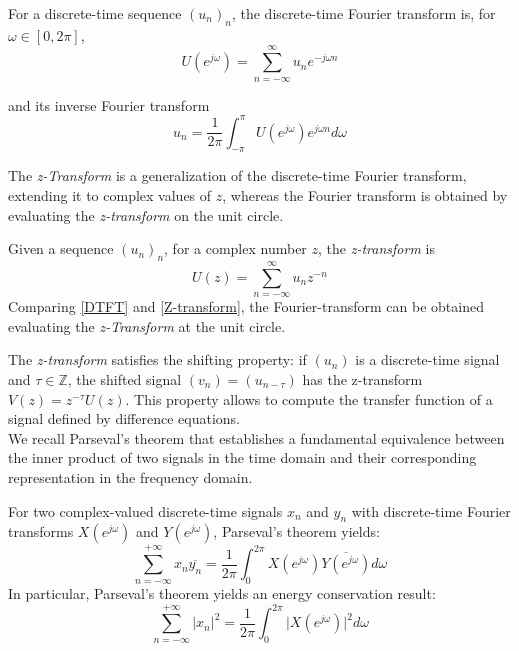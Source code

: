 \begin{definition}
    For a discrete-time sequence $(u_n)_n$, the discrete-time Fourier transform is, for $\omega\in[0, 2\pi]$,
    \begin{equation}
          U(e^{j\omega})=\sum_{n=-\infty}^\infty u_ne^{-j\omega n}  
    \label{DTFT}
    \end{equation}

    and its inverse Fourier transform 
    \begin{equation}
    u_n = \frac{1}{2\pi}\int_{-\pi}^\pi U(e^{j\omega})e^{j\omega n}d\omega
    \label{inverse DTFT}
    \end{equation}
    
\end{definition}

The \textit{z-Transform} is a generalization of the discrete-time Fourier transform, extending it to complex values of \(z\), whereas the Fourier transform is obtained by evaluating the \textit{z-transform} on the unit circle.


\begin{definition}[z-Transform]
    Given a sequence $(u_n)_n$, for a complex number $z$, the \textit{z-transform} is 
    \begin{equation}
    U(z) = \sum_{n=-\infty}^\infty u_nz^{-n}
    \label{Z-transform}
    \end{equation}
    Comparing \ref{DTFT} and \ref{Z-transform}, the Fourier-transform can be obtained evaluating the \textit{z-Transform} at the unit circle.
\end{definition}
The \textit{z-transform} satisfies the shifting property: if \( (u_n) \) is a discrete-time signal and \( \tau \in \mathbb{Z} \), the shifted signal \( (v_n) = (u_{n-\tau}) \) has the z-transform \( V(z) = z^{-\tau} U(z) \). This property allows to compute the transfer function of a signal defined by difference equations.
\\

We recall Parseval's theorem that establishes a fundamental equivalence between the inner product of two signals in the time domain and their corresponding representation in the frequency domain.

\begin{definition}
    For two complex-valued discrete-time signals \(x_n\) and \(y_n\) with discrete-time Fourier transforms \(X(e^{j\omega})\) and \(Y(e^{j\omega})\), Parseval's theorem yields:
    \begin{equation}
        \sum_{n=-\infty}^{+\infty}x_n\overline{y_n} = \frac{1}{2\pi}\int_0^{2\pi}X(e^{j\omega})\overline{Y(e^{j\omega})}d\omega
        \label{Parseval thm}
    \end{equation}
In particular, Parseval's theorem yields an energy conservation result:
    \begin{equation*}
        \sum_{n=-\infty}^{+\infty}\vert x_n\vert^2 = \frac{1}{2\pi}\int_0^{2\pi}\vert X(e^{j\omega})\vert^2 d\omega
    \end{equation*}

\end{definition}


